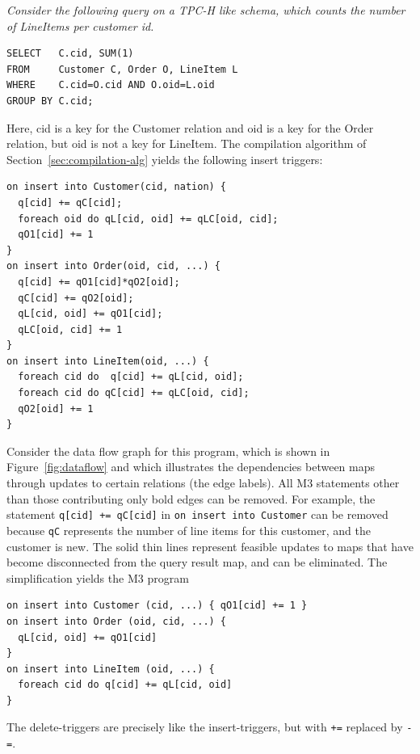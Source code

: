 \begin{example}\em
\label{ex:TPCH-Q12}
Consider the following query on a TPC-H like schema,
which counts the number of LineItems per customer id.
\begin{verbatim}
SELECT   C.cid, SUM(1)
FROM     Customer C, Order O, LineItem L
WHERE    C.cid=O.cid AND O.oid=L.oid
GROUP BY C.cid;
\end{verbatim}
Here, cid is a key for the Customer relation and oid is a key for the
Order relation, but oid is not a key for LineItem.
The compilation algorithm of Section~\ref{sec:compilation-alg} yields the
following insert triggers:
\begin{verbatim}
on insert into Customer(cid, nation) {
  q[cid] += qC[cid];
  foreach oid do qL[cid, oid] += qLC[oid, cid];
  qO1[cid] += 1
}
on insert into Order(oid, cid, ...) {
  q[cid] += qO1[cid]*qO2[oid];
  qC[cid] += qO2[oid];
  qL[cid, oid] += qO1[cid];
  qLC[oid, cid] += 1
}
on insert into LineItem(oid, ...) {
  foreach cid do  q[cid] += qL[cid, oid];
  foreach cid do qC[cid] += qLC[oid, cid];
  qO2[oid] += 1
}
\end{verbatim}

Consider the data flow graph for this program, which is shown in
Figure~\ref{fig:dataflow} and which illustrates the dependencies between
maps through updates to certain relations (the edge labels). All M3 statements
other than those contributing only bold edges can be removed. For example,
the statement {\tt q[cid] += qC[cid]} in {\tt on insert into Customer}
can be removed because {\tt qC} represents the number of line items for this
customer, and the customer is new. The solid thin lines represent
feasible updates to maps that have become disconnected from the query result
map, and can be eliminated.
The simplification yields the M3 program
\begin{verbatim}
on insert into Customer (cid, ...) { qO1[cid] += 1 }
on insert into Order (oid, cid, ...) {
  qL[cid, oid] += qO1[cid]
}
on insert into LineItem (oid, ...) {
  foreach cid do q[cid] += qL[cid, oid]
}
\end{verbatim}

The delete-triggers are precisely
like the insert-triggers, but with {\tt +=} replaced by {\tt -=}.
\punto
\end{example}


